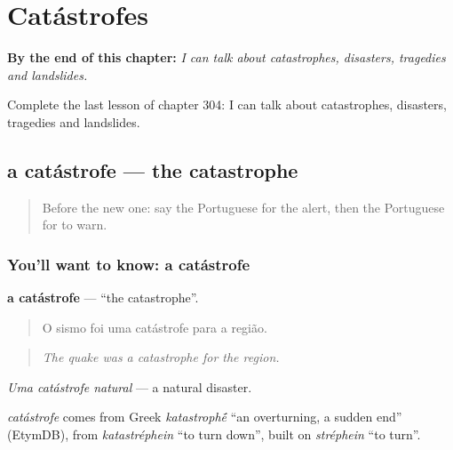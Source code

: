 
\chapter{Catástrofes}
\label{ch:pt-catastrofes}

\begin{chapteropening}
\textbf{By the end of this chapter:} \emph{I can talk about catastrophes, disasters, tragedies and landslides.}

Complete the last lesson of chapter 304: I can talk about catastrophes, disasters, tragedies and landslides.
\end{chapteropening}

\section[a catástrofe]{a catástrofe — the catastrophe}

\label{lesson:PT-C304-catastrofe}



\begin{quote}
Before the new one: say the Portuguese for the alert, then the Portuguese for to warn.
\end{quote}

\subsection*{You'll want to know: a catástrofe}
\textbf{a catástrofe} — \textquotedblleft{}the catastrophe\textquotedblright{}.

\begin{quote}
O sismo foi uma catástrofe para a região.
\end{quote}

\begin{quote}
\emph{The quake was a catastrophe for the region.}
\end{quote}

\emph{Uma catástrofe natural} — a natural disaster.

\begin{cousinweb}
\emph{catástrofe} comes from Greek \emph{katastroph\'{\={e}}} \textquotedblleft{}an overturning, a sudden end\textquotedblright{} (EtymDB), from \emph{katastréphein} \textquotedblleft{}to turn down\textquotedblright{}, built on \emph{stréphein} \textquotedblleft{}to turn\textquotedblright{}.
\end{cousinweb}


